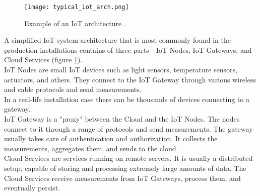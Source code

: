 	\begin{figure}[H]
		\texttt{[image: typical\_iot\_arch.png]}		
		\centering	
		\caption{Example of an IoT architecture \cite{iot-example-icons}.}
		\label{fig:iotArchExample}
	\end{figure}	
	A simplified \ac{IoT} system architecture that is most commonly found in the production installations contains of three parts - IoT Nodes, IoT Gateways, and Cloud Services (figure \ref{fig:iotArchExample}).\\
	IoT Nodes are small \ac{IoT} devices such as light sensors, temperature sensors, actuators, and others. 
		They connect to the \ac{IoT} Gateway through various wireless and cable protocols and send measurements.\\
		In a real-life installation case there can be thousands of devices connecting to a gateway. \\
		IoT Gateway is a "proxy" between the Cloud and the IoT Nodes.
		The nodes connect to it through a range of protocols and send measurements. 
		The gateway usually takes care of authentication and authorization.
		It collects the measurements, aggregates them, and sends to the cloud.\\
		Cloud Services are services running on remote servers.
		It is usually a distributed setup, capable of storing and processing extremely large amounts of data.
		The Cloud Services receive measurements from IoT Gateways, process them, and eventually persist.
